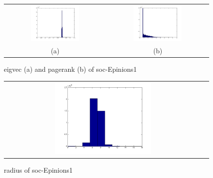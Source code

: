 \begin{figure}[htbf]
\begin{center}
\begin{tabular}{cc}
     \includegraphics[width=0.5\textwidth]{FIG/soc_result/eigvec.png} &
     \includegraphics[width=0.5\textwidth]{FIG/soc_result/pagerank.png} \\
    (a) & (b) 
\end{tabular}
\caption{ eigvec (a) and pagerank (b) of soc-Epinions1}
\label{fig:results}
\end{center}
\end{figure}

\begin{figure}[htbf]
\begin{center}
\begin{tabular}{cc}
     \includegraphics[width=0.5\textwidth]{FIG/cit_result/radius.png} \\
\end{tabular}
\caption{ radius of soc-Epinions1}
\label{fig:results}
\end{center}
\end{figure}